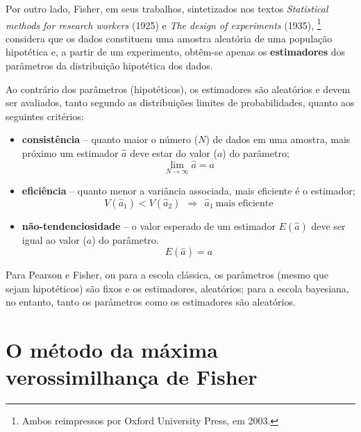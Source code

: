 Por outro lado, Fisher, em  seus trabalhos, sintetizados nos textos {\it Statistical meth\-ods for research workers} (1925)   e {\it The design of experiments} (1935), \footnote{Ambos reimpressos por Oxford University Press, em  2003.}  considera que os dados constituem uma amostra aleat\'{o}ria de uma popula\c{c}\~{a}o hipot\'{e}tica e, a partir de um experimento, obt\^{e}m-se apenas os {\bf estimadores} dos par\^{a}metros da distribui\c{c}\~{a}o hipot\'{e}tica dos dados.

Ao contr\'{a}rio dos par\^{a}metros (hipot\'{e}ticos), os estimadores s\~{a}o aleat\'{o}rios e devem ser avaliados, tanto segundo as distribui\c{c}\~{o}es  limites de probabilidades, quanto aos seguintes crit\'{e}rios:

\vspace{-0.3cm}
\begin{itemize}
\item  {\bf consist\^{e}ncia} -- quanto maior o n\'{u}mero ($N$) de dados em uma  amostra, mais pr\'{o}ximo um estimador $\hat a$  deve estar do valor ($a$) do par\^{a}metro;
         $$\displaystyle  \lim_{N \to \infty} \hat a = a $$
\vspace{-0.3cm}
    \item {\bf efici\^{e}ncia} -- quanto menor a vari\^{a}ncia  associada,  mais eficiente \'{e} o estimador;
    $$ V(\hat a_1) < V(\hat a_2)  \ \  \Longrightarrow \ \ \hat a_1 \ \mbox{mais eficiente}$$
\vspace{-0.3cm}
      \item {\bf n\~{a}o-tendenciosidade} -- o valor esperado de um estimador $E(\hat a)$ deve ser igual ao  valor ($a$) do par\^{a}metro.
          $$ E(\hat a) = a$$
\end{itemize}

Para Pearson e  Fisher, ou para a escola cl\'{a}ssica,  os par\^{a}metros (mesmo que sejam hipot\'{e}ticos) s\~{a}o fixos e os estimadores, aleat\'{o}rios; para a escola  bayesiana, no entanto, tanto os par\^{a}metros como os estimadores s\~{a}o aleat\'{o}rios.



\vspace{-0.1cm}
\section{O m\'{e}todo da m\'{a}xima verossimilhan\c{c}a de Fisher}
 \label{MAX}
\vspace{-0.1cm}
